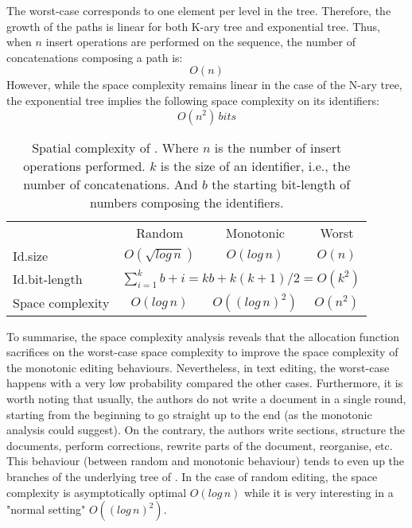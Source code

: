 \begin{asparadesc}
\item [The worst-case] corresponds to one element per level in the
  tree. Therefore, the growth of the paths is linear for both K-ary tree and
  exponential tree. Thus, when $n$ insert operations are performed on the
  sequence, the number of concatenations composing a path is:
  \begin{equation} O(n) \end{equation} However, while the space complexity
  remains linear in the case of the N-ary tree, the exponential tree implies
  the following space complexity on its identifiers:
  \begin{equation} O(n^2) \, bits \end{equation}
\end{asparadesc}

\begin{table}
  \centering
  \begin{tabular}{@{}lccc@{}}
    \toprule
    & Random & Monotonic & Worst \\ \cmidrule{2-4}
    Id.size & $O(\sqrt{log\,n})$ & $O(log\,n)$ & $O(n)$ \\ \midrule
    Id.bit-length & \multicolumn{3}{c}{ $\sum\limits_{i=1}^{k}b+i =
      kb + k(k+1)/2 = O(k^2)$} \\ \midrule
    Space complexity & $O(log\,n)$ & $O((log\,n)^2)$ &
    $O(n^2)$ \\ \bottomrule
  \end{tabular}
  \caption{Spatial complexity of \LSEQ. Where $n$ is the number
    of insert operations performed. $k$ is the size of an identifier, i.e.,
    the number of concatenations. And $b$ the starting bit-length of numbers
    composing the identifiers.}
\end{table}

To summarise, the space complexity analysis reveals that the allocation
function \LSEQ sacrifices on the worst-case space complexity to improve the
space complexity of the monotonic editing behaviours. Nevertheless, in text
editing, the worst-case happens with a very low probability compared the other
cases. Furthermore, it is worth noting that usually, the authors do not write a
document in a single round, starting from the beginning to go straight up to
the end (as the monotonic analysis could suggest). On the contrary, the authors
write sections, structure the documents, perform corrections, rewrite parts of
the document, reorganise, etc. This behaviour (between random and monotonic
behaviour) tends to even up the branches of the underlying tree of \LSEQ. In
the case of random editing, the space complexity is asymptotically optimal
$O(log\,n)$ while it is very interesting in a "normal setting" $O((log\,n)^2)$.


